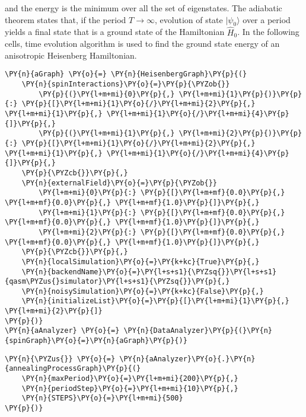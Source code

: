 and the energy is the minimum over all the set of eigenstates. The
adiabatic theorem states that, if the period \(T \rightarrow \infty\),
evolution of state \(|\psi_0\rangle\) over a period yields a final state
that is a ground state of the Hamiltonian \(\hat{H}_0\). In the
following cells, time evolution algorithm is used to find the ground
state energy of an anisotropic Heisenberg Hamiltonian.

    \begin{tcolorbox}[breakable, size=fbox, boxrule=1pt, pad at break*=1mm,colback=cellbackground, colframe=cellborder]
\begin{Verbatim}[commandchars=\\\{\}]
\PY{n}{aGraph} \PY{o}{=} \PY{n}{HeisenbergGraph}\PY{p}{(}
    \PY{n}{spinInteractions}\PY{o}{=}\PY{p}{\PYZob{}}
        \PY{p}{(}\PY{l+m+mi}{0}\PY{p}{,} \PY{l+m+mi}{1}\PY{p}{)}\PY{p}{:} \PY{p}{[}\PY{l+m+mi}{1}\PY{o}{/}\PY{l+m+mi}{2}\PY{p}{,} \PY{l+m+mi}{1}\PY{p}{,} \PY{l+m+mi}{1}\PY{o}{/}\PY{l+m+mi}{4}\PY{p}{]}\PY{p}{,}
        \PY{p}{(}\PY{l+m+mi}{1}\PY{p}{,} \PY{l+m+mi}{2}\PY{p}{)}\PY{p}{:} \PY{p}{[}\PY{l+m+mi}{1}\PY{o}{/}\PY{l+m+mi}{2}\PY{p}{,} \PY{l+m+mi}{1}\PY{p}{,} \PY{l+m+mi}{1}\PY{o}{/}\PY{l+m+mi}{4}\PY{p}{]}\PY{p}{,}
    \PY{p}{\PYZcb{}}\PY{p}{,}
    \PY{n}{externalField}\PY{o}{=}\PY{p}{\PYZob{}}
        \PY{l+m+mi}{0}\PY{p}{:} \PY{p}{[}\PY{l+m+mf}{0.0}\PY{p}{,} \PY{l+m+mf}{0.0}\PY{p}{,} \PY{l+m+mf}{1.0}\PY{p}{]}\PY{p}{,}
        \PY{l+m+mi}{1}\PY{p}{:} \PY{p}{[}\PY{l+m+mf}{0.0}\PY{p}{,} \PY{l+m+mf}{0.0}\PY{p}{,} \PY{l+m+mf}{1.0}\PY{p}{]}\PY{p}{,}
        \PY{l+m+mi}{2}\PY{p}{:} \PY{p}{[}\PY{l+m+mf}{0.0}\PY{p}{,} \PY{l+m+mf}{0.0}\PY{p}{,} \PY{l+m+mf}{1.0}\PY{p}{]}\PY{p}{,}
    \PY{p}{\PYZcb{}}\PY{p}{,}
    \PY{n}{localSimulation}\PY{o}{=}\PY{k+kc}{True}\PY{p}{,}
    \PY{n}{backendName}\PY{o}{=}\PY{l+s+s1}{\PYZsq{}}\PY{l+s+s1}{qasm\PYZus{}simulator}\PY{l+s+s1}{\PYZsq{}}\PY{p}{,}
    \PY{n}{noisySimulation}\PY{o}{=}\PY{k+kc}{False}\PY{p}{,}
    \PY{n}{initializeList}\PY{o}{=}\PY{p}{[}\PY{l+m+mi}{1}\PY{p}{,} \PY{l+m+mi}{2}\PY{p}{]}
\PY{p}{)}
\PY{n}{aAnalyzer} \PY{o}{=} \PY{n}{DataAnalyzer}\PY{p}{(}\PY{n}{spinGraph}\PY{o}{=}\PY{n}{aGraph}\PY{p}{)}
\end{Verbatim}
\end{tcolorbox}

    \begin{tcolorbox}[breakable, size=fbox, boxrule=1pt, pad at break*=1mm,colback=cellbackground, colframe=cellborder]
\begin{Verbatim}[commandchars=\\\{\}]
\PY{n}{\PYZus{}} \PY{o}{=} \PY{n}{aAnalyzer}\PY{o}{.}\PY{n}{annealingProcessGraph}\PY{p}{(}
    \PY{n}{maxPeriod}\PY{o}{=}\PY{l+m+mi}{200}\PY{p}{,}
    \PY{n}{periodStep}\PY{o}{=}\PY{l+m+mi}{10}\PY{p}{,}
    \PY{n}{STEPS}\PY{o}{=}\PY{l+m+mi}{500}
\PY{p}{)}
\end{Verbatim}
\end{tcolorbox}

    \begin{center}
    \end{center}
    { \hspace*{\fill} \\}
    
